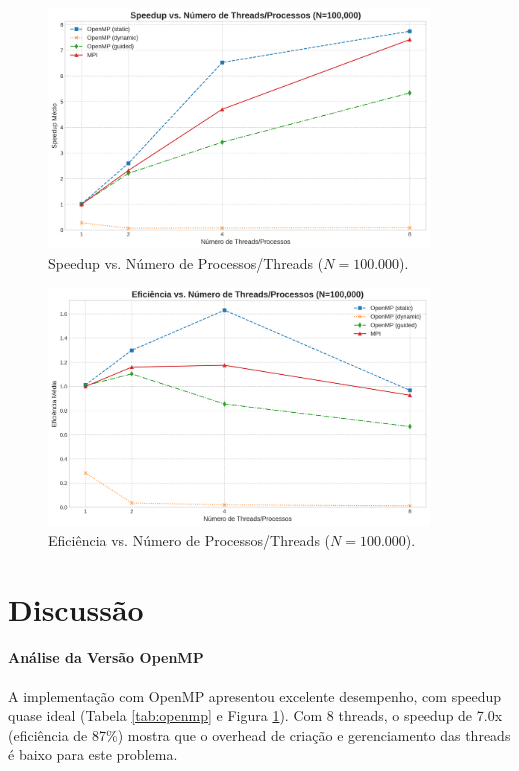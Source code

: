 \documentclass[12pt, a4paper]{article}
\begin{document}
\begin{figure}[H]
    \centering
    \includegraphics[width=0.9\textwidth]{../graficos/speedup_vs_processos_100000.png}
    \caption{Speedup vs. Número de Processos/Threads ($N=100.000$).}
    \label{fig:speedup}
\end{figure}

\begin{figure}[H]
    \centering
    \includegraphics[width=0.9\textwidth]{../graficos/eficiencia_vs_processos_100000.png}
    \caption{Eficiência vs. Número de Processos/Threads ($N=100.000$).}
    \label{fig:eficiencia}
\end{figure}

\section{Discussão}

\paragraph{Análise da Versão OpenMP} A implementação com OpenMP apresentou excelente desempenho, com speedup quase ideal (Tabela \ref{tab:openmp} e Figura \ref{fig:speedup}). Com 8 threads, o speedup de 7.0x (eficiência de 87\%) mostra que o overhead de criação e gerenciamento das threads é baixo para este problema.
\end{document}
